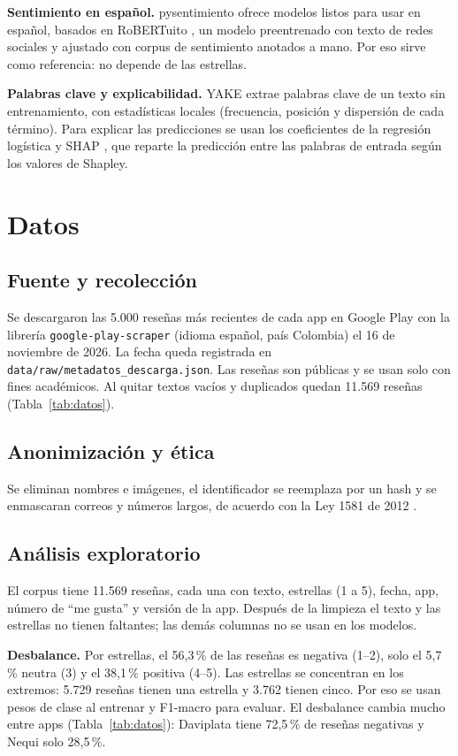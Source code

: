 \documentclass[conference]{IEEEtran}
\begin{document}
\textbf{Sentimiento en español.} pysentimiento \cite{perez2021pysentimiento} ofrece modelos listos para usar en
español, basados en RoBERTuito \cite{perez2022robertuito}, un modelo preentrenado con texto de redes sociales y
ajustado con corpus de sentimiento anotados a mano. Por eso sirve como referencia: no depende de las estrellas.

\textbf{Palabras clave y explicabilidad.} YAKE \cite{campos2020yake} extrae palabras clave de un texto sin
entrenamiento, con estadísticas locales (frecuencia, posición y dispersión de cada término). Para explicar las
predicciones se usan los coeficientes de la regresión logística y SHAP \cite{lundberg2017shap}, que reparte la
predicción entre las palabras de entrada según los valores de Shapley.

\section{Datos}
\subsection{Fuente y recolección}
Se descargaron las 5.000 reseñas más recientes de cada app en Google Play con la librería
\texttt{google-play-scraper} (idioma español, país Colombia) el 16 de noviembre de 2026. La fecha queda registrada
en \texttt{data/raw/metadatos\_descarga.json}. Las reseñas son públicas y se usan solo con fines académicos.
Al quitar textos vacíos y duplicados quedan 11.569 reseñas (Tabla~\ref{tab:datos}).
\subsection{Anonimización y ética}
Se eliminan nombres e imágenes, el identificador se reemplaza por un hash y se enmascaran correos y números
largos, de acuerdo con la Ley 1581 de 2012 \cite{ley1581}.
\subsection{Análisis exploratorio}
El corpus tiene 11.569 reseñas, cada una con texto, estrellas (1 a 5), fecha, app, número de ``me gusta'' y
versión de la app. Después de la limpieza el texto y las estrellas no tienen faltantes; las demás columnas no se
usan en los modelos.

\textbf{Desbalance.} Por estrellas, el 56,3\,\% de las reseñas es negativa (1--2), solo el 5,7\,\% neutra (3) y el
38,1\,\% positiva (4--5). Las estrellas se concentran en los extremos: 5.729 reseñas tienen una estrella y 3.762 tienen
cinco. Por eso se usan pesos de clase al entrenar y F1-macro para evaluar. El desbalance cambia mucho entre apps
(Tabla~\ref{tab:datos}): Daviplata tiene 72,5\,\% de reseñas negativas y Nequi solo 28,5\,\%.
\end{document}
